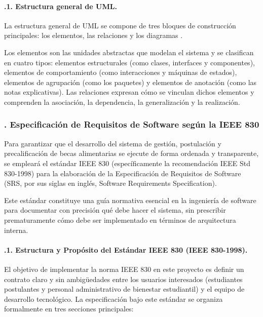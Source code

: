 \paragraph{.1. Estructura general de UML.}\label{sec:uml_estructura}

La estructura general de UML se compone de tres bloques de construcción principales: los elementos, las relaciones y los diagramas \parencite[p.~15]{booch2005uml}.

Los elementos son las unidades abstractas que modelan el sistema y se clasifican en cuatro tipos: elementos estructurales (como clases, interfaces y componentes), elementos de comportamiento (como interacciones y máquinas de estados), elementos de agrupación (como los paquetes) y elementos de anotación (como las notas explicativas). Las relaciones expresan cómo se vinculan dichos elementos y comprenden la asociación, la dependencia, la generalización y la realización.

\subsubsection{. Especificación de Requisitos de Software según la IEEE 830}\label{sec:ieee830_teoria}

Para garantizar que el desarrollo del sistema de gestión, postulación y precalificación de becas alimentarias se ejecute de forma ordenada y transparente, se empleará el estándar IEEE 830 (específicamente la recomendación IEEE Std 830-1998) para la elaboración de la Especificación de Requisitos de Software (SRS, por sus siglas en inglés, Software Requirements Specification).

Este estándar constituye una guía normativa esencial en la ingeniería de software para documentar con precisión qué debe hacer el sistema, sin prescribir prematuramente cómo debe ser implementado en términos de arquitectura interna.

\paragraph{.1. Estructura y Propósito del Estándar IEEE 830 (IEEE 830-1998).}\label{sec:ieee830_estructura}
El objetivo de implementar la norma IEEE 830 en este proyecto es definir un contrato claro y sin ambigüedades entre los usuarios interesados (estudiantes postulantes y personal administrativo de bienestar estudiantil) y el equipo de desarrollo tecnológico. La especificación bajo este estándar se organiza formalmente en tres secciones principales:

